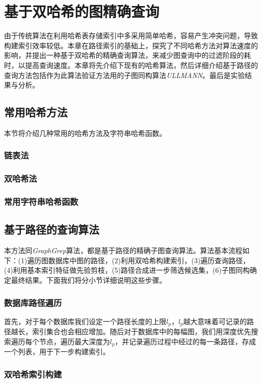 \documentclass{XDBAthesis}
\begin{document}
\else
\fi
\chapter{基于双哈希的图精确查询}
\label{chap:graphgrep}
由于传统算法在利用哈希表存储索引中多采用简单哈希，容易产生冲突问题，导致构建索引效率较低。本章在路径索引的基础上，探究了不同哈希方法对算法速度的影响，并提出一种基于双哈希的精确查询算法，来减少图查询中的过滤阶段的耗时，以提高查询速度。本章将先介绍下现有的哈希算法，然后详细介绍基于路径的查询方法包括作为此算法验证方法用的子图同构算法\emph{ULLMANN}\cite{ullmann}。最后是实验结果与分析。

\section{常用哈希方法}
本节将介绍几种常用的哈希方法及字符串哈希函数。
\subsection{链表法}
\subsection{双哈希法}
\subsection{常用字符串哈希函数}

\section{基于路径的查询算法}
本方法同\emph{GraphGrep}算法\cite{graphgrep}，都是基于路径的精确子图查询算法。算法基本流程如下：(1)遍历图数据库中图的路径，(2)利用双哈希构建索引，(3)遍历查询路径，(4)利用基本索引特征做先验剪枝，(5)路径合成进一步筛选候选集，(6)子图同构确定最终结果。下面我们将分小节详细说明这些步骤。
\subsection{数据库路径遍历}
首先，对于每个数据库我们设定一个路径长度的上限$l_p $，$l_p $越大意味着可记录的路径越长，索引集合也会相应增加。随后对于数据库中的每幅图，我们用深度优先搜索遍历每个节点，遍历最大深度为$l_p $，并记录遍历过程中经过的每一条路径，存成一个列表，用于下一步构建索引。
\subsection{双哈希索引构建}
\end{document}
